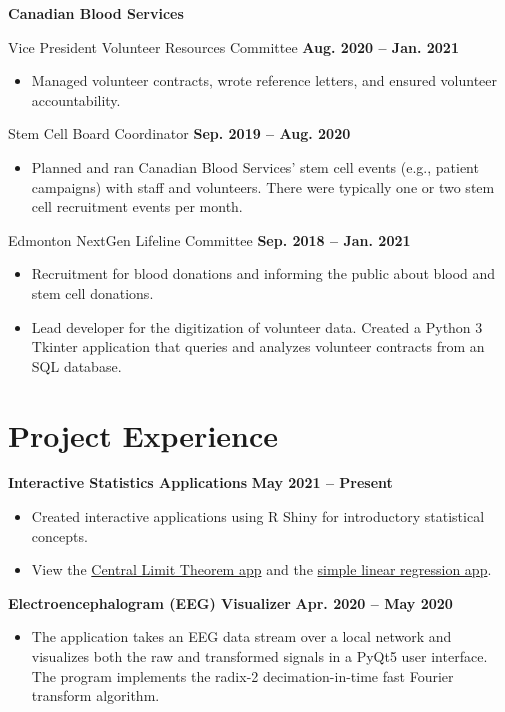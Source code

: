 \documentclass{article}
\begin{document}
\textbf{Canadian Blood Services}

Vice President Volunteer Resources Committee \hfill \textbf{Aug. 2020 -- Jan. 2021}
\begin{itemize}
    \item Managed volunteer contracts, wrote reference letters, and ensured volunteer accountability.
\end{itemize}

Stem Cell Board Coordinator \hfill \textbf{Sep. 2019 -- Aug. 2020}
\begin{itemize}
    \item Planned and ran Canadian Blood Services' stem cell events (e.g., patient campaigns) with staff and volunteers. There were typically one or two stem cell recruitment events per month.
\end{itemize}

Edmonton NextGen Lifeline Committee \hfill \textbf{Sep. 2018 -- Jan. 2021}
\begin{itemize}
    \item Recruitment for blood donations and informing the public about blood and stem cell donations.
    \item Lead developer for the digitization of volunteer data. Created a Python 3 Tkinter application that queries and analyzes volunteer contracts from an SQL database.
\end{itemize}



\section*{\textcolor{my_colour}{Project Experience}}
\vspace{-.25em} \hrulefill \vspace{.75em}

\textbf{Interactive Statistics Applications} \hfill \textbf{May 2021 -- Present}
\begin{itemize}
    \item Created interactive applications using R Shiny for introductory statistical concepts.
    \item View the \href{https://intro-stats.shinyapps.io/clt-means/}{Central Limit Theorem app} and the \href{https://intro-stats.shinyapps.io/slreg/}{simple linear regression app}.
\end{itemize}

\textbf{Electroencephalogram (EEG) Visualizer} \hfill \textbf{Apr. 2020 -- May 2020}
\begin{itemize}
    \item The application takes an EEG data stream over a local network and visualizes both the raw and transformed signals in a PyQt5 user interface. The program implements the radix-2 decimation-in-time fast Fourier transform algorithm.
\end{itemize}
\end{document}
